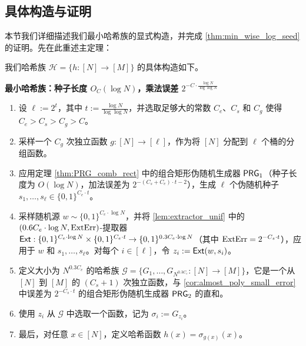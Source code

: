 \subsection{具体构造与证明}\label{sec:construction}

本节我们详细描述我们最小哈希族的显式构造，并完成 \cref{thm:min_wise_log_seed} 的证明。先在此重述主定理：

\MinWiseLogSeed*

我们哈希族 $\mathcal{H} = \{h : [N] \to [M]\}$ 的具体构造如下。

\begin{tcolorbox}[breakable]
    \textbf{最小哈希族：种子长度 $O_C(\log N)$，乘法误差 $2^{-C \cdot \frac{\log N}{\log \log N}}$}
    \begin{enumerate}
        \item 设 $\ell := 2^t$，其中 $t := \frac{\log N}{\log \log N}$，并选取足够大的常数 $C_e$、$C_s$ 和 $C_g$ 使得 $C_e > C_s > C_g > C$。
        
        \item 采样一个 $C_g$ 次独立函数 $g : [N] \to [\ell]$，作为将 $[N]$ 分配到 $\ell$ 个桶的分组函数。
    
        \item 应用定理 \cref{thm:PRG_comb_rect} 中的组合矩形伪随机生成器 $\mathsf{PRG}_1$（种子长度为 $O(\log N)$，加法误差为 $2^{- (C_s+C_e) \cdot t - 2}$），生成 $\ell$ 个伪随机种子 $s_1, \ldots, s_\ell \in \{0, 1\}^{C_e \cdot t}$。
        
        \item 采样随机源 $w \sim \{0, 1\}^{C_e \cdot \log N}$，并将 \cref{lem:extractor_unif} 中的 $(0.6 C_e \cdot \log N, \mathrm{ExtErr})$-提取器 $\mathsf{Ext} : \{0, 1\}^{C_e \cdot \log N} \times \{0, 1\}^{C_e \cdot t} \to \{0,1\}^{0.3 C_e \cdot \log N}$（其中 $\mathrm{ExtErr} = 2^{-C_s \cdot t}$），应用于 $w$ 和 $s_1, \ldots, s_\ell$。对每个 $i \in [\ell]$，令 $z_i := \mathsf{Ext}(w, s_i)$。
        
        \item 定义大小为 $N^{0.3 C_e}$ 的哈希族 $\mathcal{G} = \{ G_1, \ldots, G_{N^{0.3 C_e}} : [N] \to [M] \}$，它是一个从 $[N]$ 到 $[M]$ 的 $(C_s + 1)$ 次独立函数，与 \cref{cor:almost_poly_small_error} 中误差为 $2^{-C_s \cdot t}$ 的组合矩形伪随机生成器 $\mathsf{PRG}_2$ 的直和。
        
        \item 使用 $z_i$ 从 $\mathcal{G}$ 中选取一个函数，记为 $\sigma_i := G_{z_i}$。
        
        \item 最后，对任意 $x \in [N]$，定义哈希函数 $h(x) = \sigma_{g(x)}(x)$。
    \end{enumerate}
\end{tcolorbox}

